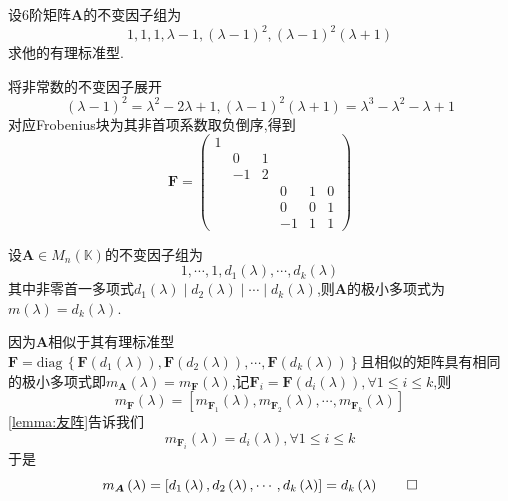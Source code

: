\begin{brown}
\begin{example}
    设$6$阶矩阵$\bm{A}$的不变因子组为
    \[
    1,1,1,\lambda-1,\left(\lambda-1\right)^2,\left(\lambda-1\right)^2\left(\lambda+1\right)
    \]求他的有理标准型.
\end{example}
\begin{solution}
    将非常数的不变因子展开
    \[
    \left(\lambda-1\right)^2=\lambda^2-2\lambda+1,\left(\lambda-1\right)^2\left(\lambda+1\right)=\lambda^3-\lambda^2-\lambda+1
    \]
    对应\textup{Frobenius}块为其非首项系数取负倒序,得到\[
    \bm{F}=\begin{pmatrix}
        1&&&&&\\
        &0&1&&&\\
        &-1&2&&&\\
        &&&0&1&0\\
        &&&0&0&1\\
        &&&-1&1&1
    \end{pmatrix}
    \]
\end{solution}
\end{brown}
\begin{formal}
\begin{theorem}[极小多项式]\label{thm:极小多项式}
    设$\bm{A}\in M_n\left(\mathbb{K}\right)$的不变因子组为\[
    1,\cdots,1,d_1\left(\lambda\right),\cdots,d_k\left(\lambda\right)
    \]其中非零首一多项式$d_1\left(\lambda\right)\mid d_2\left(\lambda\right)\mid \cdots\mid d_k\left(\lambda\right)$,则$\bm{A}$的极小多项式为$m\left(\lambda\right)=d_k\left(\lambda\right).$
\end{theorem}
\begin{Proof}
因为$\bm{A}$相似于其有理标准型$\bm{F}=\mathrm{diag}\,\left\{
\bm{F}\left(d_1\left(\lambda\right)\right),\bm{F}\left(d_2\left(\lambda\right)\right),\cdots,\bm{F}\left(d_k\left(\lambda\right)\right)
\right\}$且相似的矩阵具有相同的极小多项式即$m_{\bm{A}}\left(\lambda\right)=m_{\bm{F}}\left(\lambda\right)$,记$\bm{F}_i=\bm{F}\left(d_i\left(\lambda\right)\right),\forall 1\leqslant i\leqslant k$,则
\[
m_{\bm{F}}\left(\lambda\right)=\left[
    m_{\bm{F}_1}\left(\lambda\right),m_{\bm{F}_2}\left(\lambda\right),\cdots,m_{\bm{F}_k}\left(\lambda\right)
\right]
\]\cref{lemma:友阵}告诉我们
\[
m_{\bm{F}_i}\left(\lambda\right)=d_i\left(\lambda\right),\forall 1\leqslant i\leqslant k
\]于是
\[
m_{\bm{A}}\left(\lambda\right)=\left[
    d_1\left(\lambda\right),d_2\left(\lambda\right),\cdots,d_k\left(\lambda\right)
\right]=d_k\left(\lambda\right)\qedhere
\]
\end{Proof}
\end{formal}
